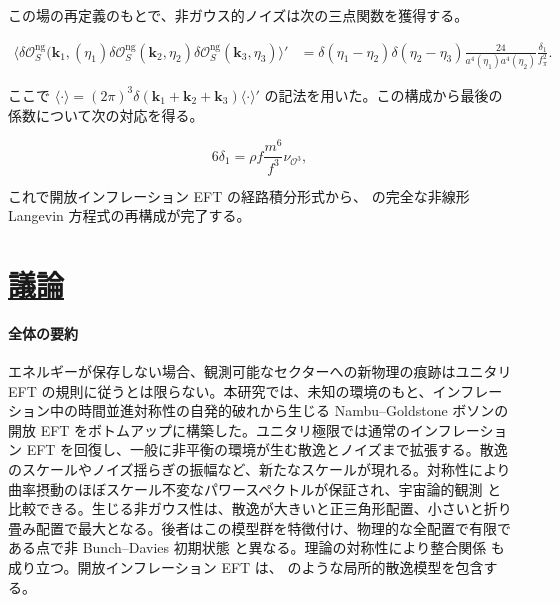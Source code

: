 \documentclass[a4paper,11pt]{ltjsarticle}
\newcommand{\sectionlink}[1]{\section[#1]{\hyperlink{toc}{#1}}}
\numberwithin{equation}{section}
\def\bfk{\textbf{k}}
\newcommand{\Os}{\delta \mathcal{O}_{S}}
\begin{document}
この場の再定義のもとで、非ガウス的ノイズは次の三点関数を獲得する。

\begin{align}
\langle\Os^{\text{ng}}(\bfk_{1},(\eta_{1})\Os^{\text{ng}}(\bfk_{2},\eta_{2})\Os^{\text{ng}}(\bfk_{3},\eta_{3})\rangle'&= \delta(\eta_{1}-\eta_{2})\delta(\eta_{2}-\eta_{3})\frac{24}{a^{4}(\eta_{1})a^{4}(\eta_{2})}  \frac{\delta_1}{f_\pi^2}.
\end{align}

ここで $\langle\cdot\rangle=(2\pi)^3\delta(\bfk_1+\bfk_2+\bfk_3)\langle\cdot\rangle'$ の記法を用いた。この構成から最後の係数について次の対応を得る。

\begin{equation}
6\delta_1 = \rho f \frac{m^6}{f^3} \nu_{\mathcal{O}^3},
\end{equation}

これで開放インフレーション EFT の経路積分形式から、\cite{Creminelli:2023aly} の完全な非線形 Langevin 方程式の再構成が完了する。

\sectionlink{議論}\label{sec:disc}

\paragraph{全体の要約} エネルギーが保存しない場合、観測可能なセクターへの新物理の痕跡はユニタリ EFT の規則に従うとは限らない。本研究では、未知の環境のもと、インフレーション中の時間並進対称性の自発的破れから生じる Nambu--Goldstone ボソンの開放 EFT をボトムアップに構築した。ユニタリ極限では通常のインフレーション EFT \cite{Cheung:2007st} を回復し、一般に非平衡の環境が生む散逸とノイズまで拡張する。散逸のスケールやノイズ揺らぎの振幅など、新たなスケールが現れる。対称性により曲率摂動のほぼスケール不変なパワースペクトルが保証され、宇宙論的観測 \cite{Planck:2018jri, DAmico:2019fhj, Colas:2019ret} と比較できる。生じる非ガウス性は、散逸が大きいと正三角形配置、小さいと折り畳み配置で最大となる。後者はこの模型群を特徴付け、物理的な全配置で有限である点で非 Bunch--Davies 初期状態 \cite{Holman:2007na, Chen:2006nt, Meerburg:2009ys, Agullo:2010ws, Ashoorioon:2010xg, Agarwal:2012mq, Ashoorioon:2013eia,  Albrecht:2014aga, Green:2020whw} と異なる。理論の対称性により整合関係 \cite{Maldacena:2002vr,Creminelli:2004yq, Cheung:2007sv, Creminelli:2012ed,Hinterbichler:2012nm,Assassi:2012zq,Pajer:2017hmb,Avis:2019eav} も成り立つ。開放インフレーション EFT は、\cite{Creminelli:2023aly} のような局所的散逸模型を包含する。
\end{document}
